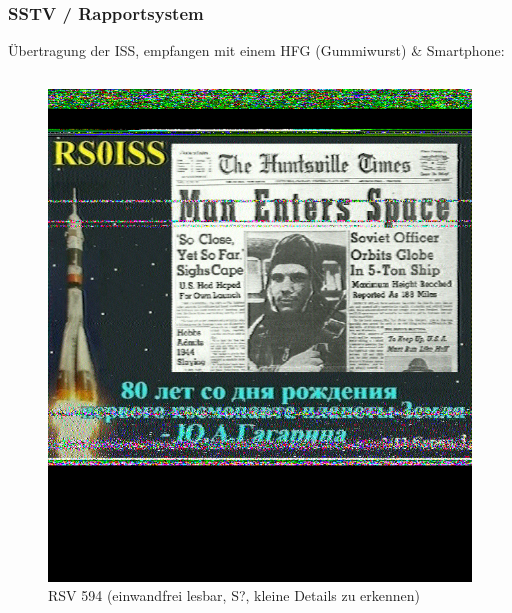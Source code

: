 \begin{frame}
  \frametitle{SSTV / Rapportsystem}

  Übertragung der ISS, empfangen mit einem HFG (Gummiwurst) \& Smartphone:

  \begin{columns}
    \begin{figure}
      \includegraphics[width=\textwidth,height=.5\textheight,keepaspectratio]{e16/SSTV-RS0ISS.jpg}
      \caption{RSV 594 (einwandfrei lesbar, S?, kleine Details zu erkennen)}
    \end{figure}


\end{columns}
\end{frame}
